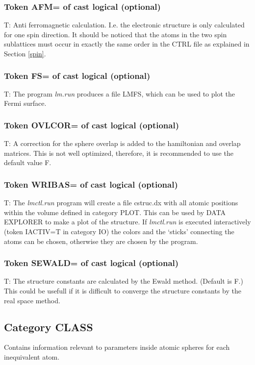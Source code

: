 \documentclass[aps,twocolumn,a4]{revtex4}
\begin{document}
\subsubsection{Token AFM= of cast logical (optional)}
T: Anti ferromagnetic calculation.  I.e. the electronic
structure is only calculated for one spin direction.  It should be
noticed that the atoms in
the two spin sublattices must occur in exactly the same order in the
CTRL file as explained in Section \ref{spin}.

\subsubsection{Token FS= of cast logical (optional)}
T: The program {\em lm.run} produces a file LMFS, which can
be used to plot the Fermi surface.

\subsubsection{Token OVLCOR= of cast logical (optional)}
T: A correction for the sphere overlap is added to the hamiltonian
and overlap matrices. This is not well optimized, therefore, it is
recommended to use the default value F.

\subsubsection{Token WRIBAS= of cast logical (optional)}
T: The {\em lmctl.run} program will create a file cstruc.dx with
all atomic positions within the volume defined in category PLOT.
This can be used by DATA EXPLORER to make a plot of the structure.
If {\em lmctl.run} is executed interactively (token IACTIV=T in
category IO) the colors and the `sticks' connecting the atoms
can be chosen, otherwise they are chosen by the program.

\subsubsection{Token SEWALD= of cast logical (optional)}
T: The structure constants are calculated by the Ewald method. (Default
is F.) This could be usefull if it is difficult to converge the
structure constants by the real space method.

\subsection{Category CLASS}
Contains information relevant to parameters inside atomic
spheres for each inequivalent atom.
\end{document}
